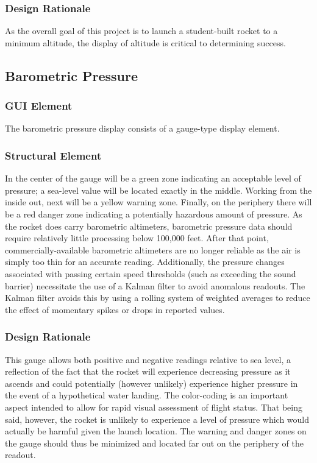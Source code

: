 \documentclass[journal,10pt,onecolumn,compsoc]{IEEEtran}
\begin{document}
		\subsubsection{Design Rationale}
			As the overall goal of this project is to launch a student-built rocket to a minimum altitude, the display of altitude is critical to determining success.

	\subsection{Barometric Pressure}

		\subsubsection{GUI Element}
			The barometric pressure display consists of a gauge-type display element.
					
		\subsubsection{Structural Element}
			In the center of the gauge will be a green zone indicating an acceptable level of pressure; a sea-level value will be located exactly in the middle.
			Working from the inside out, next will be a yellow warning zone.
			Finally, on the periphery there will be a red danger zone indicating a potentially hazardous amount of pressure.
			As the rocket does carry barometric altimeters, barometric pressure data should require relatively little processing below 100,000 feet.
			After that point, commercially-available barometric altimeters are no longer reliable as the air is simply too thin for an accurate reading.
			Additionally, the pressure changes associated with passing certain speed thresholds (such as exceeding the sound barrier) necessitate the use of a Kalman filter to avoid anomalous readouts.
			The Kalman filter avoids this by using a rolling system of weighted averages to reduce the effect of momentary spikes or drops in reported values.
			
		\subsubsection{Design Rationale}
			This gauge allows both positive and negative readings relative to sea level, a reflection of the fact that the rocket will experience decreasing pressure as it ascends and could potentially (however unlikely) experience higher pressure in the event of a hypothetical water landing.
			The color-coding is an important aspect intended to allow for rapid visual assessment of flight status.
			That being said, however, the rocket is unlikely to experience a level of pressure which would actually be harmful given the launch location.
			The warning and danger zones on the gauge should thus be minimized and located far out on the periphery of the readout.
\end{document}
